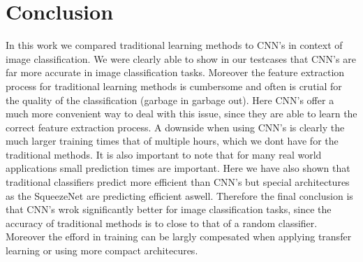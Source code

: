 \documentclass[11pt]{article}
\begin{document}
\section{Conclusion}
In this work we compared traditional learning methods to CNN's in context of image classification. We were clearly able to show in our testcases that CNN's are far more accurate in image classification tasks. Moreover the feature extraction process for traditional learning methods is cumbersome and often is crutial for the quality of the classification (garbage in garbage out). Here CNN's offer a much more convenient way to deal with this issue, since they are able to learn the correct feature extraction process. A downside when using CNN's is clearly the much larger training times that of multiple hours, which we dont have for the traditional methods. It is also important to note that for many real world applications small prediction times are important. Here we have also shown that traditional classifiers predict more efficient than CNN's but special architectures as the SqueezeNet are predicting efficient aswell. Therefore the final conclusion is that CNN's wrok significantly better for image classification tasks, since the accuracy of traditional methods is to close to that of a random classifier. Moreover the efford in training can be largly compesated when applying transfer learning or using more compact architecures. 



\newpage


\end{document}
